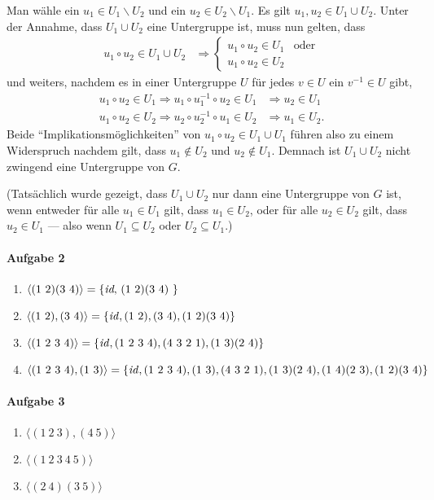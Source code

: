 \documentclass{article}
\begin{document}
\begin{enumerate}
    Man wähle ein $u_1 \in U_1 \backslash U_2$ und ein $u_2 \in U_2 \backslash U_1$. Es gilt $u_1, u_2 \in U_1 \cup U_2$. Unter der Annahme, dass $U_1 \cup U_2$ eine Untergruppe ist, muss nun gelten, dass
    \begin{align*}
        u_1 \circ u_2 \in U_1 \cup U_2 &\Rightarrow \begin{cases}
            u_1 \circ u_2 \in U_1 & \text{oder} \\
            u_1 \circ u_2 \in U_2
        \end{cases}
    \end{align*}
    und weiters, nachdem es in einer Untergruppe $U$ für jedes $v \in U$ ein $v^{-1} \in U$ gibt,
    \begin{align*}
        u_1 \circ u_2 \in U_1 \Rightarrow u_1 \circ u_1^{-1} \circ u_2 \in U_1 &\Rightarrow u_2 \in U_1 \\
        u_1 \circ u_2 \in U_2 \Rightarrow u_2 \circ u_2^{-1} \circ u_1 \in U_2 &\Rightarrow u_1 \in U_2.
    \end{align*}
    Beide \enquote{Implikationsmöglichkeiten} von $u_1 \circ u_2 \in U_1 \cup U_1$ führen also zu einem Widerspruch nachdem gilt, dass $u_1 \notin U_2$ und $u_2 \notin U_1$. Demnach ist $U_1 \cup U_2$ nicht zwingend eine Untergruppe von $G$.

    (Tatsächlich wurde gezeigt, dass $U_1 \cup U_2$ nur dann eine Untergruppe von $G$ ist, wenn entweder für alle $u_1 \in U_1$ gilt, dass $u_1 \in U_2$, oder für alle $u_2 \in U_2$ gilt, dass $u_2 \in U_1$ --- also wenn $U_1 \subseteq U_2$ oder $U_2 \subseteq U_1$.)
\end{enumerate}

\paragraph{Aufgabe 2}

\begin{enumerate}
    \item $\langle (1\ 2)(3\ 4) \rangle = \{ \text{\emph{id}, (1\ 2)(3\ 4) } \}$
    
    \item $\langle (1\ 2), (3\ 4) \rangle = \{ \text{\emph{id}}, (1\ 2), (3\ 4), (1\ 2)(3\ 4) \}$
    
    \item $\langle (1\ 2\ 3\ 4) \rangle = \{ \text{\emph{id}}, (1\ 2\ 3\ 4), (4\ 3\ 2\ 1), (1\ 3)(2\ 4) \}$
    
    \item $\langle (1\ 2\ 3\ 4), (1\ 3) \rangle = \{ \text{\emph{id}}, (1\ 2\ 3\ 4), (1\ 3), (4\ 3\ 2\ 1), (1\ 3)(2\ 4), (1\ 4)(2\ 3), (1\ 2)(3\ 4) \}$
\end{enumerate}

\paragraph{Aufgabe 3}

\begin{enumerate}
    \item $\langle (1\ 2\ 3), (4\ 5) \rangle$
    \item $\langle (1\ 2\ 3\ 4\ 5) \rangle$
    \item $\langle (2\ 4)(3\ 5) \rangle$
\end{enumerate}
\end{document}
